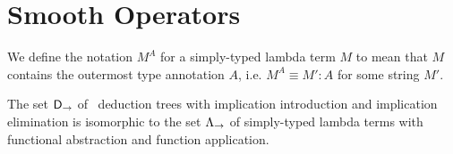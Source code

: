 \section{Smooth Operators}

\begin{definition}
We define the notation $M^{A}$ for a simply-typed lambda term $M$ to mean that
$M$ contains the outermost type annotation $A$, i.e. $M^A \equiv M':A$ for some
string $M'$.
\end{definition}

\begin{theorem}
The set $\mathsf{D}_\to$ of \implnpi\ deduction trees with implication introduction
and implication elimination is isomorphic to the set $\Lambda_\to$ of
simply-typed lambda terms with functional abstraction and function application.
\end{theorem}

